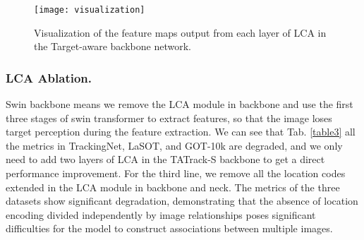 \documentclass[letterpaper]{article} \usepackage{aaai23}  \usepackage{times}  \usepackage{helvet}  \usepackage{courier}  \usepackage[hyphens]{url}  \usepackage{graphicx} \urlstyle{rm} \def\UrlFont{\rm}  \usepackage{natbib}  \usepackage{caption} \frenchspacing  \setlength{\pdfpagewidth}{8.5in}  \setlength{\pdfpageheight}{11in}  \usepackage{algorithm}
\begin{document}
\begin{figure*}[t]
\centering
\texttt{[image: visualization]} \caption{Visualization of the feature maps output from each layer of LCA in the Target-aware backbone network.}
\label{fig3}
\end{figure*}

\begin{table}[t]
\centering
{}
\caption{Ablation studies on TATrack-S.}
\label{table3}
\end{table}


\subsubsection{LCA Ablation.}
Swin backbone means we remove the LCA module in backbone and use the first three stages of swin transformer to extract features, so that the image loses target perception during the feature extraction. We can see that Tab. \ref{table3} all the metrics in TrackingNet, LaSOT, and GOT-10k are degraded, and we only need to add two layers of LCA in the TATrack-S backbone to get a direct performance improvement. For the third line, we remove all the location codes extended in the LCA module in backbone and neck. The metrics of the three datasets show significant degradation, demonstrating that the absence of location encoding divided independently by image relationships poses significant difficulties for the model to construct associations between multiple images.
\end{document}
